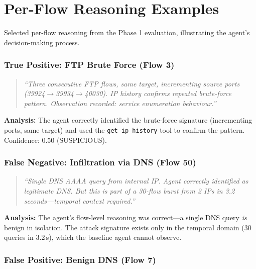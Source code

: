 \documentclass[12pt, a4paper, oneside]{report}
\begin{document}
\appendix

\chapter{Per-Flow Reasoning Examples}
\label{app:reasoning}

Selected per-flow reasoning from the Phase 1 evaluation, illustrating the
agent's decision-making process.

\subsection{True Positive: FTP Brute Force (Flow 3)}

\begin{quote}
\small\itshape
``Three consecutive FTP flows, same target, incrementing source ports
(39924$\rightarrow$39934$\rightarrow$40030). IP history confirms repeated
brute-force pattern. Observation recorded: service enumeration behaviour.''
\end{quote}

\textbf{Analysis:} The agent correctly identified the brute-force signature
(incrementing ports, same target) and used the \texttt{get\_ip\_history} tool
to confirm the pattern. Confidence: 0.50 (SUSPICIOUS).

\subsection{False Negative: Infiltration via DNS (Flow 50)}

\begin{quote}
\small\itshape
``Single DNS AAAA query from internal IP. Agent correctly identified as
legitimate DNS. But this is part of a 30-flow burst from 2 IPs in 3.2
seconds---temporal context required.''
\end{quote}

\textbf{Analysis:} The agent's flow-level reasoning was correct---a single DNS
query \emph{is} benign in isolation. The attack signature exists only in the
temporal domain (30 queries in 3.2\,s), which the baseline agent cannot observe.

\subsection{False Positive: Benign DNS (Flow 7)}
\end{document}
